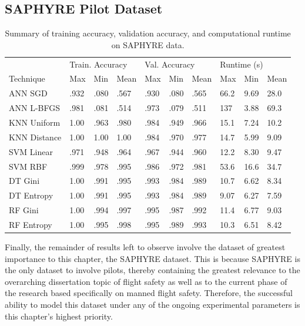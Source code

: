 \documentclass[12pt]{uthesis-v12}  %
\begin{document}
\subsection{SAPHYRE Pilot Dataset}

\begin{table}[!t]
\caption{Summary of training accuracy, validation accuracy, and computational runtime on SAPHYRE data.}
\renewcommand{\arraystretch}{1.3}
\centering
{\begin{tabular}{*{10}{l}}
\toprule
& \multicolumn{3}{l}{Train. Accuracy} & \multicolumn{3}{l}{Val. Accuracy} & \multicolumn{3}{l}{Runtime (s)} \\
Technique & Max & Min & Mean & Max & Min & Mean & Max & Min & Mean \\ \midrule
ANN SGD & .932 & .080 & .567 & .930 & .080 & .565 & 66.2 & 9.69 & 28.0 \\ 
ANN L-BFGS & .981 & .081 & .514 & .973 & .079 & .511 & 137 & 3.88 & 69.3 \\ 
KNN Uniform & 1.00 & .963 & .980 & .984 & .949 & .966 & 15.1 & 7.24 & 10.2 \\
KNN Distance & 1.00 & 1.00 & 1.00 & .984 & .970 & .977 & 14.7 & 5.99 & 9.09 \\
SVM Linear & .971 & .948 & .964 & .967 & .944 & .960 & 12.2 & 8.30 & 9.47 \\
SVM RBF & .999 & .978 & .995 & .986 & .972 & .981 & 53.6 & 16.6 & 34.7 \\
DT Gini & 1.00 & .991 & .995 & .993 & .984 & .989 & 10.7 & 6.62 & 8.34 \\
DT Entropy & 1.00 & .991 & .995 & .993 & .984 & .989 & 9.07 & 6.27 & 7.59 \\
RF Gini & 1.00 & .994 & .997 & .995 & .987 & .992 & 11.4 & 6.77 & 9.03 \\
RF Entropy & 1.00 & .995 & .998 & .995 & .989 & .993 & 10.3 & 6.51 & 8.42 \\ \bottomrule
\end{tabular}}

\label{tvr-saphyre}
\end{table}

Finally, the remainder of results left to observe involve the dataset of greatest importance to this chapter, the SAPHYRE dataset. This is because SAPHYRE is the only dataset to involve pilots, thereby containing the greatest relevance to the overarching dissertation topic of flight safety as well as to the current phase of the research based specifically on manned flight safety. Therefore, the successful ability to model this dataset under any of the ongoing experimental parameters is this chapter's highest priority.
\end{document}
